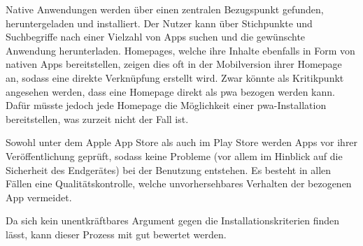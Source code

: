  Native Anwendungen werden über einen zentralen Bezugspunkt gefunden, heruntergeladen und installiert. Der Nutzer kann über Stichpunkte und Suchbegriffe nach einer Vielzahl von Apps suchen und die gewünschte Anwendung herunterladen. Homepages, welche ihre Inhalte ebenfalls in Form von nativen Apps bereitstellen, zeigen dies oft in der Mobilversion ihrer Homepage an, sodass eine direkte Verknüpfung erstellt wird. Zwar könnte als Kritikpunkt angesehen werden, dass eine Homepage direkt als \ac{pwa} bezogen werden kann. Dafür müsste jedoch jede Homepage die Möglichkeit einer \ac{pwa}-Installation bereitstellen, was zurzeit nicht der Fall ist.
 
 Sowohl unter dem Apple App Store als auch im Play Store werden Apps vor ihrer Veröffentlichung geprüft, sodass keine Probleme (vor allem im Hinblick auf die Sicherheit des Endgerätes) bei der Benutzung entstehen. Es besteht in allen Fällen eine Qualitätskontrolle, welche unvorhersehbares Verhalten der bezogenen App vermeidet.
 
 Da sich kein unentkräftbares Argument gegen die Installationskriterien finden lässt, kann dieser Prozess mit gut bewertet werden.